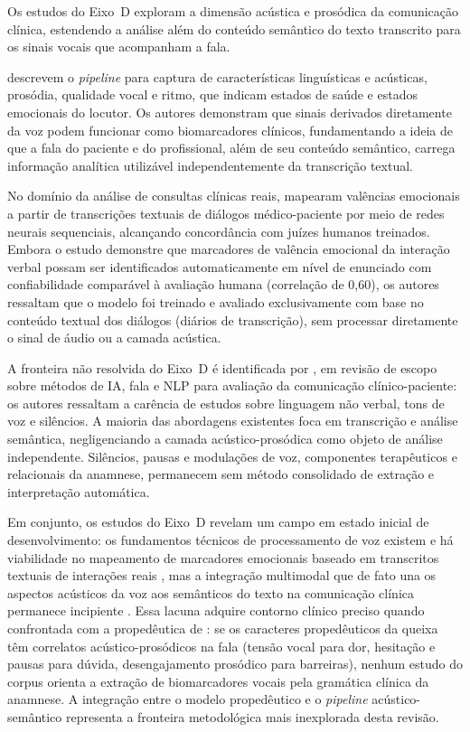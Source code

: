 \documentclass[a4paper,fleqn]{cas-sc}
\begin{document}
Os estudos do Eixo~D exploram a dimensão acústica e prosódica da
comunicação clínica, estendendo a análise além do conteúdo semântico
do texto transcrito para os sinais vocais que acompanham a fala.

\citet{Fagherazzi2021} descrevem o \textit{pipeline} para captura de
características linguísticas e acústicas, prosódia, qualidade vocal
e ritmo, que indicam estados de saúde e estados emocionais do
locutor. Os autores demonstram que sinais derivados diretamente da
voz podem funcionar como biomarcadores clínicos, fundamentando a
ideia de que a fala do paciente e do profissional, além de seu
conteúdo semântico, carrega informação analítica utilizável
independentemente da transcrição textual.

No domínio da análise de consultas clínicas reais, \citet{Imel2022}
mapearam valências emocionais a partir de transcrições textuais de
diálogos médico-paciente por meio de redes neurais sequenciais,
alcançando concordância com juízes humanos treinados. Embora o estudo
demonstre que marcadores de valência emocional da interação verbal
possam ser identificados automaticamente em nível de enunciado com
confiabilidade comparável à avaliação humana (correlação de 0{,}60),
os autores ressaltam que o modelo foi treinado e avaliado
exclusivamente com base no conteúdo textual dos diálogos (diários de
transcrição), sem processar diretamente o sinal de áudio ou a camada
acústica.

A fronteira não resolvida do Eixo~D é identificada por
\citet{Albert2024}, em revisão de escopo sobre métodos de IA, fala e
NLP para avaliação da comunicação clínico-paciente: os autores
ressaltam a carência de estudos sobre linguagem não verbal, tons de
voz e silêncios. A maioria das abordagens existentes foca em
transcrição e análise semântica, negligenciando a camada
acústico-prosódica como objeto de análise independente. Silêncios,
pausas e modulações de voz, componentes terapêuticos e relacionais
da anamnese, permanecem sem método consolidado de extração e
interpretação automática.

Em conjunto, os estudos do Eixo~D revelam um campo em estado inicial
de desenvolvimento: os fundamentos técnicos de processamento de voz
existem \citep{Fagherazzi2021} e há viabilidade no mapeamento de
marcadores emocionais baseado em transcritos textuais de interações
reais \citep{Imel2022}, mas a integração multimodal que de fato una
os aspectos acústicos da voz aos semânticos do texto na comunicação
clínica permanece incipiente \citep{Albert2024}. Essa lacuna adquire contorno clínico preciso
quando confrontada com a propedêutica de \citet{Porto2019}: se os
caracteres propedêuticos da queixa têm correlatos acústico-prosódicos
na fala (tensão vocal para dor, hesitação e pausas para dúvida,
desengajamento prosódico para barreiras), nenhum estudo do corpus
orienta a extração de biomarcadores vocais pela gramática clínica da
anamnese. A integração entre o modelo propedêutico e o
\textit{pipeline} acústico-semântico representa a fronteira
metodológica mais inexplorada desta revisão.
\end{document}
